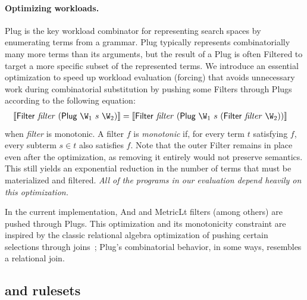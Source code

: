 \paragraph*{Optimizing workloads.}

\textsf{Plug} is the key workload combinator
  for representing search spaces by
  enumerating terms from a grammar.
\textsf{Plug} typically represents
  combinatorially many more terms
  than its arguments,
  but the result of a \textsf{Plug}
  is often \textsf{Filter}ed to
  target a more specific subset of
  the represented terms.
We introduce an essential optimization
  to speed up workload evaluation (forcing)
  that avoids unnecessary work during
  combinatorial substitution by
  pushing some \textsf{Filter}s through \textsf{Plug}s
  according to the following equation:
\begin{align*}
  \denote{\mathsf{Filter} ~ \mathit{filter} ~
          (\mathsf{Plug} ~ \W_1 ~ s ~ \W_2)} &=
  \denote{\mathsf{Filter} ~ \mathit{filter} ~
          (\mathsf{Plug} ~ \W_1 ~ s ~ (\mathsf{Filter} ~ \mathit{filter} ~ \W_2))}
\end{align*}
\noindent
when \textit{filter} is monotonic.
A filter $f$ is \emph{monotonic}
  if, for every term $t$ satisfying $f$,
  every subterm $s \in t$ also satisfies $f$.
Note that the outer \textsf{Filter}
  remains in place even after the optimization,
  as removing it entirely would not
  preserve semantics.
This still yields an exponential reduction
  in the number of terms that must be
  materialized and filtered.
\textit{
  All of the \enumo programs in our evaluation
  depend heavily on this optimization.}

In the current \enumo implementation,
  \textsf{And} and \textsf{MetricLt} filters (among others) are pushed
  through \textsf{Plug}s.
This optimization and its
  monotonicity constraint are inspired by the
  classic relational algebra optimization
  of pushing certain selections through joins~\citep{alice};
  \textsf{Plug}'s combinatorial behavior,
  in some ways, resembles a relational join.

\subsection{\Egraphs and rulesets}
\label{subsec:ruleset-sem}

